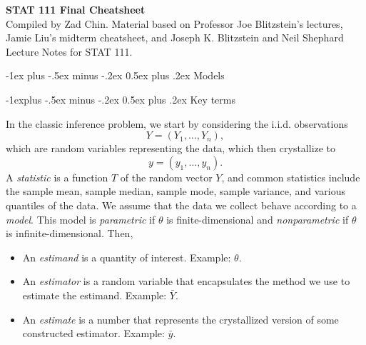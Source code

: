 \documentclass[10pt,landscape]{article}
\makeatletter
\renewcommand{\section}{\@startsection{section}{1}{0mm}%
                                {-1ex plus -.5ex minus -.2ex}%
                                {0.5ex plus .2ex}%
                                {\normalfont\large\bfseries}}
\renewcommand{\subsection}{\@startsection{subsection}{2}{0mm}%
                                {-1explus -.5ex minus -.2ex}%
                                {0.5ex plus .2ex}%
                                {\normalfont\normalsize\bfseries}}
\makeatother
\begin{document}
\raggedright
\footnotesize
\begin{multicols*}{3}

\setlength{\premulticols}{1pt}
\setlength{\postmulticols}{1pt}
\setlength{\multicolsep}{1pt}
\setlength{\columnsep}{2pt}



    {\color{blue} \Large{\textbf{STAT 111 Final Cheatsheet}}} \\



\scriptsize
 Compiled by Zad Chin. Material based on Professor Joe Blitzstein's lectures, Jamie Liu's midterm cheatsheet, and Joseph K. Blitzstein and Neil Shephard Lecture Notes for STAT 111.



\scriptsize



\section{Models}

\subsection{Key terms}

In the classic inference problem, we start by considering the i.i.d. observations $$Y=(Y_1,\dots,Y_n),$$ which are random variables representing the data, which then crystallize to $$y=(y_1,\dots,y_n).$$ A \emph{statistic} is a function $T$ of the random vector $Y$, and common statistics include the sample mean, sample median, sample mode, sample variance, and various quantiles of the data. We assume that the data we collect behave according to a \emph{model}. This model is \emph{parametric} if $\theta$ is finite-dimensional and \emph{nonparametric} if $\theta$ is infinite-dimensional. Then,
\begin{itemize}
    \item An \emph{estimand} is a quantity of interest. Example: $\theta$.
    \item An \emph{estimator} is a random variable that encapsulates the method we use to estimate the estimand. Example: $\bar{Y}$.
    \item An \emph{estimate} is a number that represents the crystallized version of some constructed estimator. Example: $\bar{y}$.
\end{itemize}


\end{multicols*}
\end{document}
